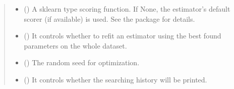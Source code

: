 \documentclass[letterpaper,10pt,english]{sphinxmanual}
\begin{document}
\begin{fulllineitems}
\begin{quote}
\begin{description}
\begin{itemize}
\item {} 
 (\sphinxstyleliteralemphasis{\sphinxupquote{, }}\sphinxstyleliteralemphasis{\sphinxupquote{, }}\sphinxstyleliteralemphasis{\sphinxupquote{, }}\sphinxstyleliteralemphasis{\sphinxupquote{, }}\sphinxstyleliteralemphasis{\sphinxupquote{, }}) \textendash{} A sklearn type scoring function. 
If None, the estimator’s default scorer (if available) is used. See the package  for details.

\item {} 
 (\sphinxstyleliteralemphasis{\sphinxupquote{, }}\sphinxstyleliteralemphasis{\sphinxupquote{, }}) \textendash{} It controls whether to refit an estimator using the best found parameters on the whole dataset.

\item {} 
 (\sphinxstyleliteralemphasis{\sphinxupquote{, }}\sphinxstyleliteralemphasis{\sphinxupquote{, }}) \textendash{} The random seed for optimization.

\item {} 
 (\sphinxstyleliteralemphasis{\sphinxupquote{, }}\sphinxstyleliteralemphasis{\sphinxupquote{, }}) \textendash{} It controls whether the searching history will be printed.

\end{itemize}

\end{description}\end{quote}


\end{fulllineitems}
\end{document}
